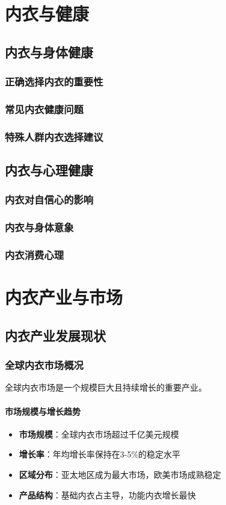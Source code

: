 \documentclass[12pt,UTF8]{ctexbook}
\begin{document}
\part{内衣与健康}

\chapter{内衣与身体健康}
\section{正确选择内衣的重要性}
\section{常见内衣健康问题}
\section{特殊人群内衣选择建议}

\chapter{内衣与心理健康}
\section{内衣对自信心的影响}
\section{内衣与身体意象}
\section{内衣消费心理}

\part{内衣产业与市场}

\chapter{内衣产业发展现状}
\section{全球内衣市场概况}
全球内衣市场是一个规模巨大且持续增长的重要产业。

\subsection{市场规模与增长趋势}
\begin{itemize}[leftmargin=2cm]
	\item \textbf{市场规模}：全球内衣市场超过千亿美元规模
	\item \textbf{增长率}：年均增长率保持在3-5\%的稳定水平
	\item \textbf{区域分布}：亚太地区成为最大市场，欧美市场成熟稳定
	\item \textbf{产品结构}：基础内衣占主导，功能内衣增长最快
\end{itemize}
\end{document}
